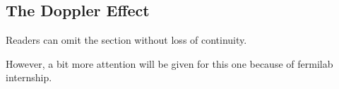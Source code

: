 \subsection{The Doppler Effect}

Readers can omit the section without loss of continuity.

However, a bit more attention will be given for this one because of fermilab internship.